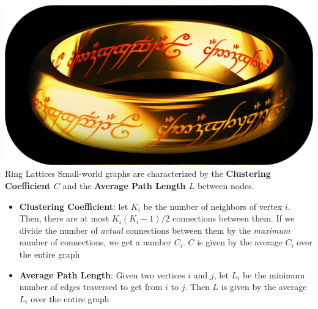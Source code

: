 \documentclass[serif,mathserif]{beamer}
\begin{document}
\begin{frame}{\includegraphics[height=0.06\textheight]{ring-of-power.eps}\hspace{0.25cm} Ring Lattices}
    Small-world graphs are characterized by the \textbf{Clustering Coefficient $C$} and the \textbf{Average Path Length $L$} between nodes.\\
    \begin{itemize}
        \vspace{0.25cm}
        \item \textbf{Clustering Coefficient}: let $K_i$ be the number of neighbors of vertex $i$. Then, there are at most $K_i(K_i-1)/2$ connections between them. If we divide the number of \emph{actual} connections between them by the \emph{maximum} number of connections, we get a number $C_i$. $C$ is given by the average $C_i$ over the entire graph
        \vspace{0.25cm}
        \item \textbf{Average Path Length}: Given two vertices $i$ and $j$, let $L_i$ be the minimum number of edges traversed to get from $i$ to $j$. Then $L$ is given by the average $L_i$ over the entire graph
    \end{itemize}
\end{frame}
\end{document}

